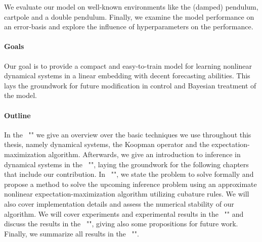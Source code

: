 	We evaluate our model on well-known environments like the (damped) pendulum, cartpole and a double pendulum. Finally, we examine the model performance on an error-basis and explore the influence of hyperparameters on the performance.

\paragraph{Goals}
	Our goal is to provide a compact and easy-to-train model for learning nonlinear dynamical systems in a linear embedding with decent forecasting abilities. This lays the groundwork for future modification in control and Bayesian treatment of the model.

\paragraph{Outline}
	In the \chapterautorefname~"" we give an overview over the basic techniques we use throughout this thesis, namely dynamical systems, the Koopman operator and the expectation-maximization algorithm. Afterwards, we give an introduction to inference in dynamical systems in the \chapterautorefname~"", laying the groundwork for the following chapters that include our contribution. In \chapterautorefname~"", we state the problem to solve formally and propose a method to solve the upcoming inference problem using an approximate nonlinear expectation-maximization algorithm utilizing cubature rules. We will also cover implementation details and assess the numerical stability of our algorithm. We will cover experiments and experimental results in the \chapterautorefname~"" and discuss the results in the \chapterautorefname~"", giving also some propositions for future work. Finally, we summarize all results in the \chapterautorefname~"".
